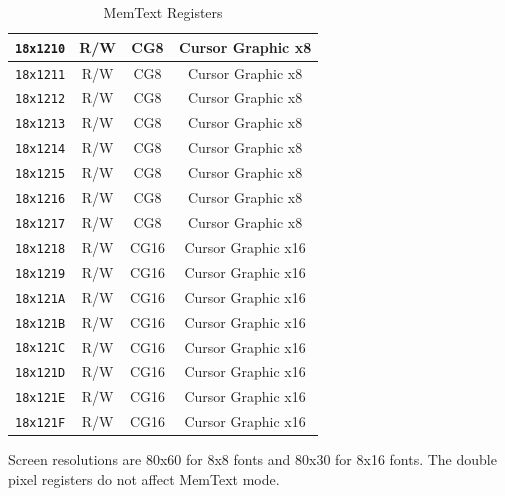 \begin{table}[ht]
\begin{center}
\begin{tabular}{|c|c|c|c|c|c|c|c|c|c|c|}
            \verb+18x1210+ & R/W & CG8 & \multicolumn{8}{|c|}{Cursor Graphic x8} \\ \hline
            \verb+18x1211+ & R/W & CG8 & \multicolumn{8}{|c|}{Cursor Graphic x8} \\ \hline
            \verb+18x1212+ & R/W & CG8 & \multicolumn{8}{|c|}{Cursor Graphic x8} \\ \hline
            \verb+18x1213+ & R/W & CG8 & \multicolumn{8}{|c|}{Cursor Graphic x8} \\ \hline
            \verb+18x1214+ & R/W & CG8 & \multicolumn{8}{|c|}{Cursor Graphic x8} \\ \hline
            \verb+18x1215+ & R/W & CG8 & \multicolumn{8}{|c|}{Cursor Graphic x8} \\ \hline
            \verb+18x1216+ & R/W & CG8 & \multicolumn{8}{|c|}{Cursor Graphic x8} \\ \hline
            \verb+18x1217+ & R/W & CG8 & \multicolumn{8}{|c|}{Cursor Graphic x8} \\ \hline
            \verb+18x1218+ & R/W & CG16 & \multicolumn{8}{|c|}{Cursor Graphic x16} \\ \hline
            \verb+18x1219+ & R/W & CG16 & \multicolumn{8}{|c|}{Cursor Graphic x16} \\ \hline
            \verb+18x121A+ & R/W & CG16 & \multicolumn{8}{|c|}{Cursor Graphic x16} \\ \hline
            \verb+18x121B+ & R/W & CG16 & \multicolumn{8}{|c|}{Cursor Graphic x16} \\ \hline
            \verb+18x121C+ & R/W & CG16 & \multicolumn{8}{|c|}{Cursor Graphic x16} \\ \hline
            \verb+18x121D+ & R/W & CG16 & \multicolumn{8}{|c|}{Cursor Graphic x16} \\ \hline
            \verb+18x121E+ & R/W & CG16 & \multicolumn{8}{|c|}{Cursor Graphic x16} \\ \hline
            \verb+18x121F+ & R/W & CG16 & \multicolumn{8}{|c|}{Cursor Graphic x16} \\ \hline
        \end{tabular}
    \end{center}
    \caption{MemText Registers}
    \label{tab:memtext_reg}
\end{table}

Screen resolutions are 80x60 for 8x8 fonts and 80x30 for 8x16 fonts.  The double pixel registers do not affect MemText mode.

